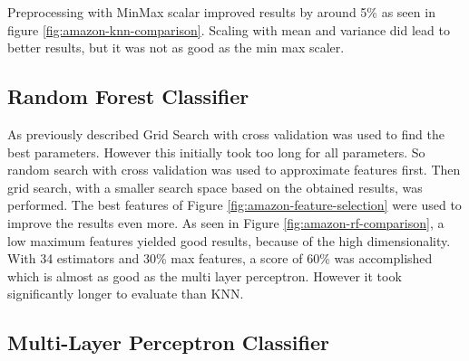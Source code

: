 Preprocessing with MinMax scalar improved results by around 5\% as seen in figure \ref{fig:amazon-knn-comparison}.
Scaling with mean and variance did lead to better results, but it was not as good as the min max scaler.




\subsection{Random Forest Classifier}

As previously described Grid Search with cross validation was used to find the best parameters.
However this initially took too long for all parameters.
So random search with cross validation was used to approximate features first.
Then grid search, with a smaller search space based on the obtained results, was performed.
The best features of Figure \ref{fig:amazon-feature-selection} were used to improve the results even more. 
As seen in Figure \ref{fig:amazon-rf-comparison}, a low maximum features yielded good results, because of the high dimensionality.
With 34 estimators and 30\% max features, a score of 60\% was accomplished which is almost as good as the multi layer perceptron.
However it took significantly longer to evaluate than KNN.



\subsection{Multi-Layer Perceptron Classifier}

